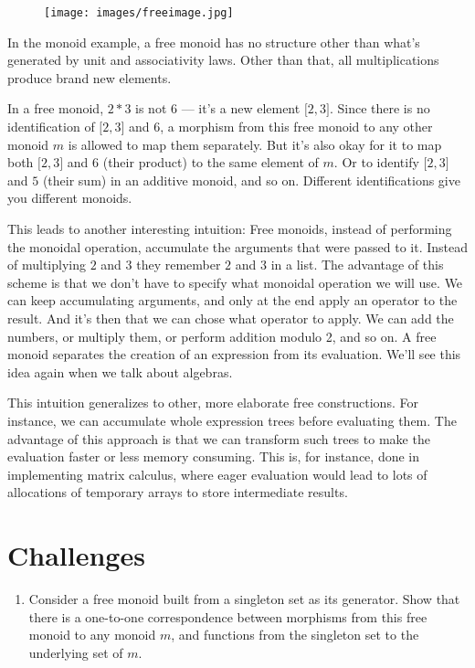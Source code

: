 \begin{figure}[H]
\centering
\texttt{[image: images/freeimage.jpg]}
\end{figure}

\noindent
In the monoid example, a free monoid has no structure other than what's
generated by unit and associativity laws. Other than that, all
multiplications produce brand new elements.

In a free monoid, $2 * 3$ is not $6$ --- it's a new element ${[}2, 3{]}$. Since
there is no identification of ${[}2, 3{]}$ and $6$, a morphism from this
free monoid to any other monoid $m$ is allowed to map them
separately. But it's also okay for it to map both ${[}2, 3{]}$ and $6$
(their product) to the same element of $m$. Or to identify ${[}2,
3{]}$ and $5$ (their sum) in an additive monoid, and so on. Different
identifications give you different monoids.

This leads to another interesting intuition: Free monoids, instead of
performing the monoidal operation, accumulate the arguments that were
passed to it. Instead of multiplying $2$ and $3$ they remember $2$ and $3$ in a
list. The advantage of this scheme is that we don't have to specify what
monoidal operation we will use. We can keep accumulating arguments, and
only at the end apply an operator to the result. And it's then that we
can chose what operator to apply. We can add the numbers, or multiply
them, or perform addition modulo 2, and so on. A free monoid separates
the creation of an expression from its evaluation. We'll see this idea
again when we talk about algebras.

This intuition generalizes to other, more elaborate free constructions.
For instance, we can accumulate whole expression trees before evaluating
them. The advantage of this approach is that we can transform such trees
to make the evaluation faster or less memory consuming. This is, for
instance, done in implementing matrix calculus, where eager evaluation
would lead to lots of allocations of temporary arrays to store
intermediate results.

\section{Challenges}

\begin{enumerate}
\tightlist
\item
  Consider a free monoid built from a singleton set as its generator.
  Show that there is a one-to-one correspondence between morphisms from
  this free monoid to any monoid $m$, and functions from the
  singleton set to the underlying set of $m$.
\end{enumerate}
